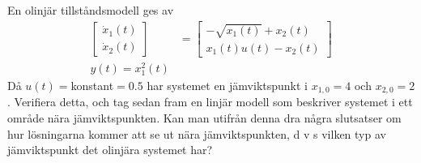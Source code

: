 \subsection{}
En olinjär tillståndsmodell ges av 
\begin{align*}
 \begin{bmatrix} \dot{x}_1(t)\\\dot{x}_2(t)\end{bmatrix}&=\begin{bmatrix}
 -\sqrt{x_1(t)}+x_2(t)\\x_1(t)u(t)-x_2(t)\end{bmatrix} \\
y(t)=x_1^2(t)
\end{align*}
Då $u(t)=$konstant$=0.5$ har systemet en jämviktspunkt i $x_{1,0}=4$ och
$x_{2,0}=2$. Verifiera detta, och tag sedan fram en linjär modell som
beskriver systemet i ett område nära jämviktspunkten. Kan man utifrån
denna dra
några slutsatser om hur lösningarna kommer att se ut nära
jämviktspunkten, d v s vilken typ av jämviktspunkt det olinjära
systemet har? 




